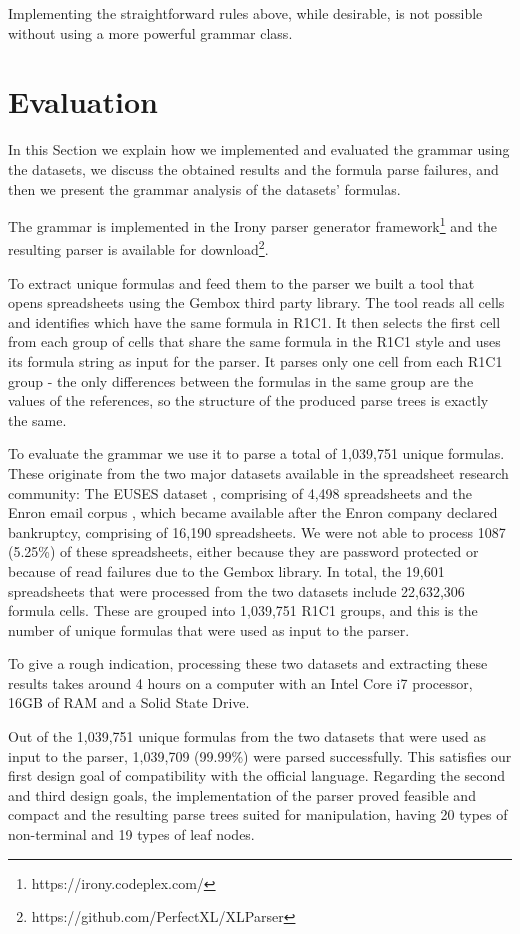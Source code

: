 \documentclass[conference]{IEEEtran}
\begin{document}
Implementing the straightforward rules above, while desirable, is not possible without using a more powerful grammar class.

\section{Evaluation}
\label{sec:evaluation}

In this Section we explain how we implemented and evaluated the grammar using the datasets, we discuss the obtained results and the formula parse failures, and then we present the grammar analysis of the datasets' formulas.

The grammar is implemented in the Irony parser generator framework\footnote{https://irony.codeplex.com/} and the resulting parser is available for download\footnote{https://github.com/PerfectXL/XLParser}.

To extract unique formulas and feed them to the parser we built a tool that opens spreadsheets using the Gembox third party library. The tool reads all cells and identifies which have the same formula in R1C1. It then selects the first cell from each group of cells that share the same formula in the R1C1 style and uses its formula string as input for the parser. It parses only one cell from each R1C1 group - the only differences between the formulas in the same group are the values of the references, so the structure of the produced parse trees is exactly the same.

To evaluate the grammar we use it to parse a total of 1,039,751 unique formulas. These originate from the two major datasets available in the spreadsheet research community: The EUSES dataset \cite{euses}, comprising of 4,498 spreadsheets and the Enron email corpus \cite{enron}, which became available after the Enron company declared bankruptcy, comprising of 16,190 spreadsheets. We were not able to process 1087 (5.25\%) of these spreadsheets, either because they are password protected or because of read failures due to the Gembox library. In total, the 19,601 spreadsheets that were processed from the two datasets include 22,632,306 formula cells. These are grouped into 1,039,751 R1C1 groups, and this is the number of unique formulas that were used as input to the parser.

To give a rough indication, processing these two datasets and extracting these results takes around 4 hours on a computer with an Intel Core i7 processor, 16GB of RAM and a Solid State Drive.

Out of the 1,039,751 unique formulas from the two datasets that were used as input to the parser, 1,039,709 (99.99\%) were parsed successfully. This satisfies our first design goal of compatibility with the official language. Regarding the second and third design goals, the implementation of the parser proved feasible and compact and the resulting parse trees suited for manipulation, having 20 types of non-terminal and 19 types of leaf nodes.
\end{document}
